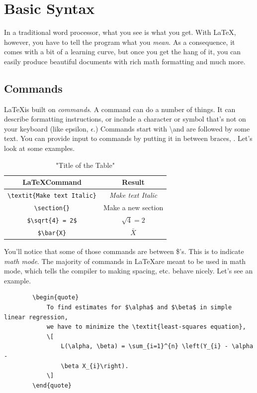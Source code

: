 \documentclass[12pt]{article}
\begin{document}
	
	\section{Basic Syntax}
	
	In a traditional word processor, what you see is what you get. With \LaTeX, however, you have to tell the program what you \textit{mean}. As a consequence, it comes with a bit of a learning curve, but once you get the hang of it, you can easily produce beautiful documents with rich math formatting and much more.
	
	\subsection{Commands}
	
	\LaTeX is built on \textit{commands}. A command can do a number of things. It can describe formatting instructions, or include a character or symbol that's not on your keyboard (like epsilon, $\epsilon$.) Commands start with \textbackslash and are followed by some text. You can provide input to commands by putting it in between braces, \textbraceleft \textbraceright. Let's look at some examples.
	
	\begin{table}[H]
		\centering
	        \caption{"Title of the Table"}
		\begin{tabular}{c|c} %
			\textbf{\LaTeX Command} & \textbf{Result} \\ \hline %
			\verb|\textit{Make text Italic}| & \textit{Make text Italic} \\
			\verb|\section{}| & Make a new section \\
			\verb|$\sqrt{4} = 2$| & $\sqrt{4} = 2$ \\ 
			\verb|$\bar{X}| & $\bar{X}$
		\end{tabular}
	\end{table}
	
	You'll notice that some of those commands are between \$'s. This is to indicate \textit{math mode}. The majority of commands in \LaTeX are meant to be used in math mode, which tells the compiler to making spacing, etc. behave nicely. Let's see an example.
	
	\begin{verbatim}
		\begin{quote}
		    To find estimates for $\alpha$ and $\beta$ in simple linear regression, 
		    we have to minimize the \textit{least-squares equation},
	    	\[
	            L(\alpha, \beta) = \sum_{i=1}^{n} \left(Y_{i} - \alpha - 
	            \beta X_{i}\right).
		    \]
		\end{quote}
	\end{verbatim}
	
\end{document}
